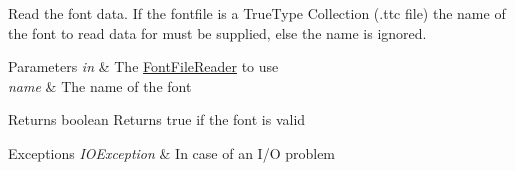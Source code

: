 Read the font data. If the fontfile is a True\+Type Collection (.ttc file) the name of the font to read data for must be supplied, else the name is ignored.


\begin{DoxyParams}{Parameters}
{\em in} & The \mbox{\hyperlink{classorg_1_1newdawn_1_1slick_1_1tools_1_1hiero_1_1truetype_1_1_font_file_reader}{Font\+File\+Reader}} to use \\
\hline
{\em name} & The name of the font \\
\hline
\end{DoxyParams}
\begin{DoxyReturn}{Returns}
boolean Returns true if the font is valid 
\end{DoxyReturn}

\begin{DoxyExceptions}{Exceptions}
{\em I\+O\+Exception} & In case of an I/O problem \\
\hline
\end{DoxyExceptions}

